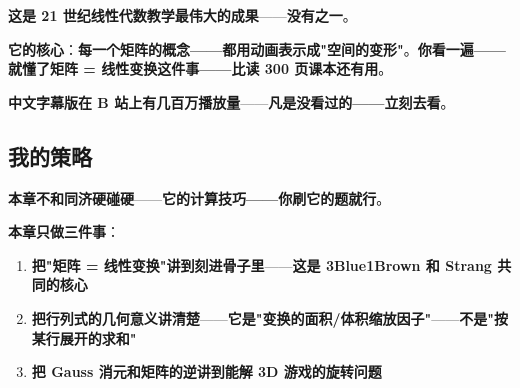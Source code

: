 \textbf{这是 21 世纪线性代数教学最伟大的成果}——\textbf{没有之一}。

\textbf{它的核心}：\textbf{每一个矩阵的概念——都用动画表示成"空间的变形"}。\textbf{你看一遍——就懂了矩阵 = 线性变换这件事——比读 300 页课本还有用}。

\textbf{中文字幕版在 B 站上有几百万播放量}——\textbf{凡是没看过的——立刻去看}。

\subsection{我的策略}

\textbf{本章不和同济硬碰硬}——\textbf{它的计算技巧——你刷它的题就行}。

\textbf{本章只做三件事}：

\begin{enumerate}
\item \textbf{把"矩阵 = 线性变换"讲到刻进骨子里}——\textbf{这是 3Blue1Brown 和 Strang 共同的核心}
\item \textbf{把行列式的几何意义讲清楚}——\textbf{它是"变换的面积/体积缩放因子"}——\textbf{不是"按某行展开的求和"}
\item \textbf{把 Gauss 消元和矩阵的逆讲到能解 3D 游戏的旋转问题}
\end{enumerate}

